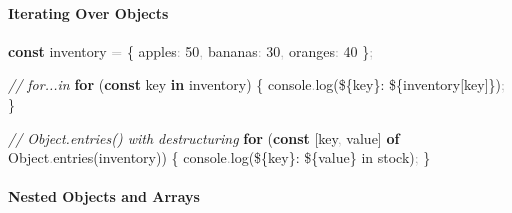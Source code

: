 \documentclass[
  justified,
  openright,
]{tufte-book}
\let\subsection\paragraph
\let\paragraph\paragraph
\newcommand{\KeywordTok}[1]{\textcolor{CodeKeyword}{\textbf{#1}}}  %
\newcommand{\StringTok}[1]{\textcolor{CodeString}{#1}}              %
\newcommand{\CommentTok}[1]{\textcolor{CodeComment}{\textit{#1}}}  %
\newcommand{\CodeNumTok}[1]{\textcolor{CodeNumber}{#1}}             %
\newcommand{\CodeFuncTok}[1]{\textcolor{CodeKeyword}{#1}}           %
\newcommand{\CodeTypeTok}[1]{\textcolor{CodeType}{#1}}              %
\newcommand{\OperatorTok}[1]{\textcolor{DarkGray}{#1}}              %
\newenvironment{Shaded}{%
  \begin{mdframed}[style=TufteCode]%
}{%
  \end{mdframed}%
}
\let\subsection\paragraph
\let\paragraph\paragraph
\begin{document}
\subsection{Iterating Over Objects}\label{iterating-over-objects}

\begin{Shaded}
\begin{Highlighting}[]
\KeywordTok{const} inventory \OperatorTok{=} \{ \CodeTypeTok{apples}\OperatorTok{:} \CodeNumTok{50}\OperatorTok{,} \CodeTypeTok{bananas}\OperatorTok{:} \CodeNumTok{30}\OperatorTok{,} \CodeTypeTok{oranges}\OperatorTok{:} \CodeNumTok{40} \}\OperatorTok{;}
 
\CommentTok{// for...in}
\KeywordTok{for} (\KeywordTok{const} key \KeywordTok{in} inventory) \{
  console\OperatorTok{.}\CodeFuncTok{log}(\StringTok{\textasciigrave{}}\StringTok{\$\{}key\StringTok{\}}\StringTok{: }\StringTok{\$\{}inventory[key]\StringTok{\}}\StringTok{\textasciigrave{}})\OperatorTok{;}
\}
 
\CommentTok{// Object.entries() with destructuring}
\KeywordTok{for} (\KeywordTok{const} [key\OperatorTok{,} value] \KeywordTok{of} Object\OperatorTok{.}\CodeFuncTok{entries}(inventory)) \{
  console\OperatorTok{.}\CodeFuncTok{log}(\StringTok{\textasciigrave{}}\StringTok{\$\{}key\StringTok{\}}\StringTok{: }\StringTok{\$\{}value\StringTok{\}}\StringTok{ in stock\textasciigrave{}})\OperatorTok{;}
\}
\end{Highlighting}
\end{Shaded}

\subsection{Nested Objects and
Arrays}\label{nested-objects-and-arrays}
\end{document}
